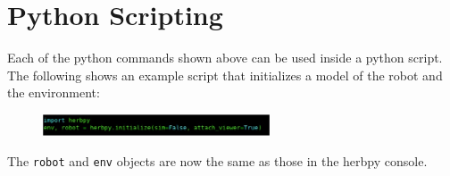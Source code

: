 \documentclass[11pt, oneside]{article}
\begin{document}
\newpage
\section{Python Scripting}
Each of the python commands shown above can be used inside a python script.  The following shows an example script that initializes a model of the robot and the environment:
\begin{figure}[h]
\centering
\includegraphics[width=0.6\textwidth]{figs/python}
\end{figure}
The \texttt{robot} and \texttt{env} objects are now the same as those in the herbpy console.
\end{document}
